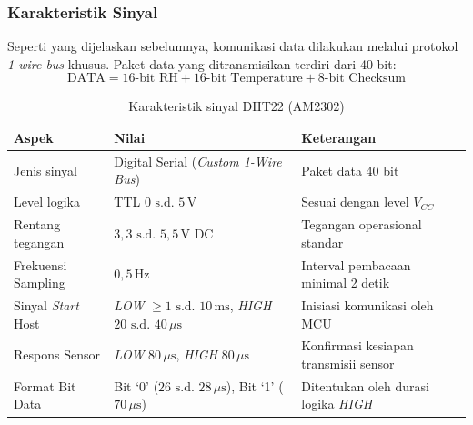 \subsubsection{Karakteristik Sinyal}
Seperti yang dijelaskan sebelumnya, komunikasi data dilakukan melalui protokol \textit{1-wire bus} khusus. Paket data yang ditransmisikan terdiri dari 40 bit:
\begin{equation}
	\text{DATA} = \text{16-bit RH} + \text{16-bit Temperature} + \text{8-bit Checksum}
	\label{eq:dht22-packet}
\end{equation}

\begin{table}[H]
	\centering
	\caption{Karakteristik sinyal DHT22 (AM2302)}
	\label{tab:dht22_sinyal}
	\small
	\begin{tabularx}{\textwidth}{@{}lXX@{}}
		\toprule
		Aspek                      & Nilai                                                                                  & Keterangan                                  \\
		\midrule
		Jenis sinyal               & Digital Serial (\textit{Custom 1-Wire Bus})                                            & Paket data 40 bit                           \\
		Level logika               & TTL $0\text{ s.d. }5\,\text{V}$                                                            & Sesuai dengan level $V_{CC}$                \\
		Rentang tegangan           & $3{,}3\text{ s.d. }5{,}5\,\text{V DC}$                                                     & Tegangan operasional standar                \\
		Frekuensi Sampling         & $0{,}5\,\text{Hz}$                                                                     & Interval pembacaan minimal 2 detik          \\
		Sinyal \textit{Start} Host & \textit{LOW} $\ge 1\text{ s.d. }10\,\text{ms}$, \textit{HIGH} $20\text{ s.d. }40\,\mu\text{s}$ & Inisiasi komunikasi oleh MCU                \\
		Respons Sensor             & \textit{LOW} $80\,\mu\text{s}$, \textit{HIGH} $80\,\mu\text{s}$                        & Konfirmasi kesiapan transmisii sensor       \\
		Format Bit Data            & Bit `0' ($26\text{ s.d. }28\,\mu\text{s}$), Bit `1' ($70\,\mu\text{s}$)                    & Ditentukan oleh durasi logika \textit{HIGH} \\
		\bottomrule
	\end{tabularx}
\end{table}

